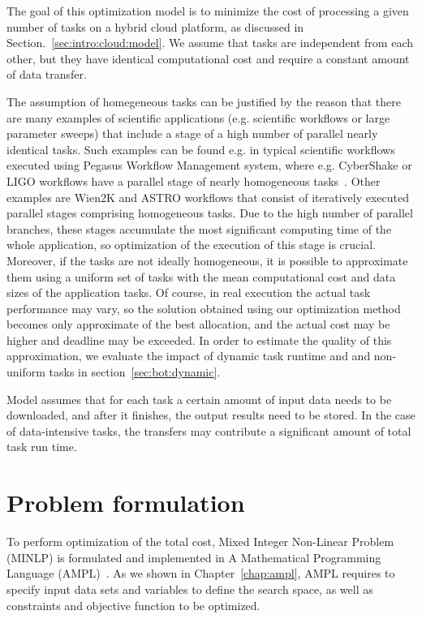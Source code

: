 {  The goal of this optimization model is to minimize the cost of processing a given number of tasks on a hybrid cloud platform, as discussed in Section.~\ref{sec:intro:cloud:model}. We assume that tasks are independent from each other, but they have identical computational cost and require a constant amount of data transfer. 

  The assumption of homegeneous tasks can be justified by the reason that there are many examples of scientific applications (e.g. scientific workflows or large parameter sweeps) that include a stage of a high number of parallel nearly identical tasks. Such examples can be found e.g. in typical scientific workflows executed using Pegasus Workflow Management system, where e.g. CyberShake or LIGO workflows have a parallel stage of nearly homogeneous tasks~\cite{Bharathi08}. Other examples are Wien2K and ASTRO workflows that consist of iteratively executed parallel stages comprising homogeneous tasks\cite{Duan12}. Due to the high number of parallel branches, these stages accumulate the most significant computing time of the whole application, so optimization of the execution of this stage is crucial. Moreover, if the tasks are not ideally homogeneous, it is possible to approximate them using a uniform set of tasks with the mean computational cost and data sizes of the application tasks. Of course, in real execution the actual task performance may vary, so the solution obtained using our optimization method becomes only approximate of the best allocation, and the actual cost may be higher and deadline may be exceeded. In order to estimate the quality of this approximation, we evaluate the impact of dynamic task runtime and and non-uniform tasks in section~\ref{sec:bot:dynamic}. 

  Model assumes that for each task a certain amount of input data needs to be downloaded, and after it finishes, the output results need to be stored. In the case of data-intensive tasks, the transfers may contribute a significant amount of total task run time.

\section{Problem formulation}
\label{sec:bot:problem}

  To perform optimization of the total cost, Mixed Integer Non-Linear Problem (MINLP) is formulated and implemented in A Mathematical Programming Language (AMPL)~\cite{Fourer2002}.  As we shown in Chapter~\ref{chap:ampl}, AMPL requires to specify input data sets and variables to define the search space, as well as constraints and objective function to be optimized.

}
